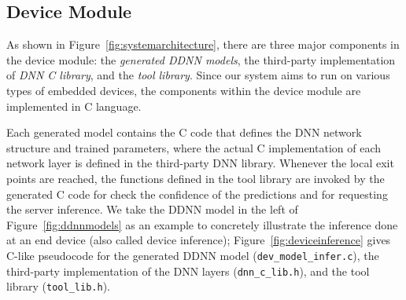 \documentclass[conference]{IEEEtran}
\def\figurename{Figure}
\begin{document}
\subsection{Device Module}
\label{sec:devicemodule}
As shown in \figurename~\ref{fig:systemarchitecture}, there are three major components in the device module: the \emph{generated DDNN models}, the third-party implementation of \emph{DNN C library}, and the \emph{tool library}. Since our system aims to run on various types of embedded devices, the components within the device module are implemented in C language.

Each generated model contains the C code that defines the DNN network structure and trained parameters, where the actual C implementation of each network layer is defined in the third-party DNN library. Whenever the local exit points are reached, the functions defined in the tool library are invoked by the generated C code for check the confidence of the predictions and for requesting the server inference. We take the DDNN model in the left of \figurename~\ref{fig:ddnnmodels} as an example to concretely illustrate the inference done at an end device (also called device inference); \figurename~\ref{fig:deviceinference} gives C-like pseudocode for the generated DDNN model (\texttt{dev\_model\_infer.c}), the third-party implementation of the DNN layers (\texttt{dnn\_c\_lib.h}), and the tool library (\texttt{tool\_lib.h}).
\end{document}
